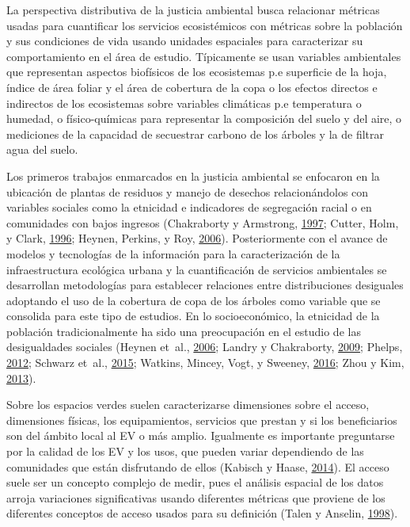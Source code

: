 \documentclass[12pt,a4paper,oneside, openany]{book}
\theoremstyle{definition}
\theoremstyle{definition}
\theoremstyle{definition}
\theoremstyle{remark}
\begin{document}
La perspectiva distributiva de la justicia ambiental busca relacionar
métricas usadas para cuantificar los servicios ecosistémicos con
métricas sobre la población y sus condiciones de vida usando unidades
espaciales para caracterizar su comportamiento en el área de estudio.
Típicamente se usan variables ambientales que representan aspectos
biofísicos de los ecosistemas p.e superficie de la hoja, índice de área
foliar y el área de cobertura de la copa o los efectos directos e
indirectos de los ecosistemas sobre variables climáticas p.e temperatura
o humedad, o físico-químicas para representar la composición del suelo y
del aire, o mediciones de la capacidad de secuestrar carbono de los
árboles y la de filtrar agua del suelo.

Los primeros trabajos enmarcados en la justicia ambiental se enfocaron
en la ubicación de plantas de residuos y manejo de desechos
relacionándolos con variables sociales como la etnicidad e indicadores
de segregación racial o en comunidades con bajos ingresos (Chakraborty y
Armstrong, \protect\hyperlink{ref-chakraborty1997exploring}{1997};
Cutter, Holm, y Clark, \protect\hyperlink{ref-cutter_role_1996}{1996};
Heynen, Perkins, y Roy,
\protect\hyperlink{ref-heynen_political_2006}{2006}). Posteriormente con
el avance de modelos y tecnologías de la información para la
caracterización de la infraestructura ecológica urbana y la
cuantificación de servicios ambientales se desarrollan metodologías para
establecer relaciones entre distribuciones desiguales adoptando el uso
de la cobertura de copa de los árboles como variable que se consolida
para este tipo de estudios. En lo socioeconómico, la etnicidad de la
población tradicionalmente ha sido una preocupación en el estudio de las
desigualdades sociales (Heynen et~al.,
\protect\hyperlink{ref-heynen_political_2006}{2006}; Landry y
Chakraborty, \protect\hyperlink{ref-landry_street_2009}{2009}; Phelps,
\protect\hyperlink{ref-phelps_association_2012}{2012}; Schwarz et~al.,
\protect\hyperlink{ref-schwarz_trees_2015}{2015}; Watkins, Mincey, Vogt,
y Sweeney, \protect\hyperlink{ref-watkins_is_2016}{2016}; Zhou y Kim,
\protect\hyperlink{ref-zhou_social_2013}{2013}).

Sobre los espacios verdes suelen caracterizarse dimensiones sobre el
acceso, dimensiones físicas, los equipamientos, servicios que prestan y
si los beneficiarios son del ámbito local al EV o más amplio. Igualmente
es importante preguntarse por la calidad de los EV y los usos, que
pueden variar dependiendo de las comunidades que están disfrutando de
ellos (Kabisch y Haase,
\protect\hyperlink{ref-kabisch_green_2014}{2014}). El acceso suele ser
un concepto complejo de medir, pues el análisis espacial de los datos
arroja variaciones significativas usando diferentes métricas que
proviene de los diferentes conceptos de acceso usados para su definición
(Talen y Anselin, \protect\hyperlink{ref-talen_assessing_1998}{1998}).
\end{document}
